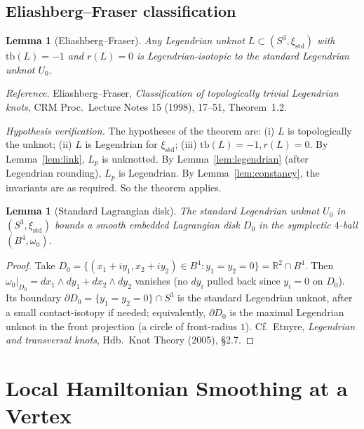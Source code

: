 \documentclass[12pt]{article}
\newtheorem{lemma}[theorem]{Lemma}
\theoremstyle{definition}
\begin{document}
\subsection{Eliashberg--Fraser classification}

\begin{lemma}[Eliashberg--Fraser]\label{lem:eliashberg-fraser}
Any Legendrian unknot $L\subset(S^3,\xi_{\mathrm{std}})$ with $\mathrm{tb}(L)=-1$ and $r(L)=0$ is Legendrian-isotopic to the standard Legendrian unknot $U_0$.
\end{lemma}

\noindent\emph{Reference.} Eliashberg--Fraser, \emph{Classification of topologically trivial Legendrian knots}, CRM Proc.\ Lecture Notes 15 (1998), 17--51, Theorem~1.2.

\noindent\emph{Hypothesis verification.} The hypotheses of the theorem are: (i) $L$ is topologically the unknot; (ii) $L$ is Legendrian for $\xi_{\mathrm{std}}$; (iii) $\mathrm{tb}(L)=-1,r(L)=0$. By Lemma~\ref{lem:link}, $L_p$ is unknotted. By Lemma~\ref{lem:legendrian} (after Legendrian rounding), $L_p$ is Legendrian. By Lemma~\ref{lem:constancy}, the invariants are as required. So the theorem applies.

\begin{lemma}[Standard Lagrangian disk]\label{lem:disk}
The standard Legendrian unknot $U_0$ in $(S^3,\xi_{\mathrm{std}})$ bounds a smooth embedded Lagrangian disk $D_0$ in the symplectic $4$-ball $(B^4,\omega_0)$.
\end{lemma}

\begin{proof}
Take $D_0=\{(x_1+iy_1,x_2+iy_2)\in B^4:y_1=y_2=0\}=\mathbb{R}^2\cap B^4$. Then $\omega_0|_{D_0}=dx_1\wedge dy_1+dx_2\wedge dy_2$ vanishes (no $dy_i$ pulled back since $y_i=0$ on $D_0$). Its boundary $\partial D_0=\{y_1=y_2=0\}\cap S^3$ is the standard Legendrian unknot, after a small contact-isotopy if needed; equivalently, $\partial D_0$ is the maximal Legendrian unknot in the front projection (a circle of front-radius $1$). Cf.\ Etnyre, \emph{Legendrian and transversal knots}, Hdb.\ Knot Theory (2005), §2.7.
\end{proof}

\section{Local Hamiltonian Smoothing at a Vertex}
\end{document}
